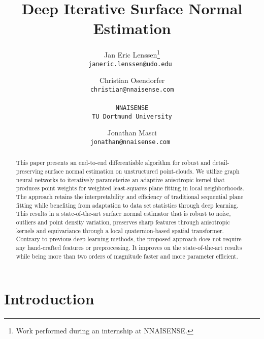 \documentclass[10pt,twocolumn,letterpaper]{article}
\begin{document}
\title{Deep Iterative Surface Normal Estimation}

\author{Jan Eric Lenssen\thanks{Work performed during an internship at NNAISENSE.} \\
\tt\small janeric.lenssen@udo.edu
\and
Christian Osendorfer\\
\tt\small christian@nnaisense.com
\\
\\
 NNAISENSE \\
 TU Dortmund University\\
\and
Jonathan Masci\\
\tt\small jonathan@nnaisense.com
}

\maketitle
\thispagestyle{empty}
\vspace{-1cm}

\begin{abstract}
This paper presents an end-to-end differentiable algorithm for robust and detail-preserving surface normal estimation on unstructured point-clouds. We utilize graph neural networks to iteratively parameterize an adaptive anisotropic kernel that produces point weights for weighted least-squares plane fitting in local neighborhoods.
The approach retains the interpretability and efficiency of traditional sequential
plane fitting while benefiting from adaptation to data set statistics through deep learning.
This results in a state-of-the-art surface normal estimator that is robust to
noise, outliers and point density variation, preserves sharp features
through anisotropic kernels and equivariance through a local quaternion-based spatial transformer. Contrary to
previous deep learning methods, the proposed approach does not require any 
hand-crafted features or preprocessing. It improves on the state-of-the-art results while being more than two orders of magnitude faster and more parameter efficient. 
\end{abstract}
\vspace{-0.3cm}
\section{Introduction}
\end{document}
